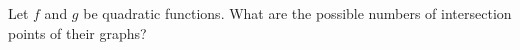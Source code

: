 Let $f$ and $g$ be quadratic functions. What are the possible numbers of intersection points of their graphs?
